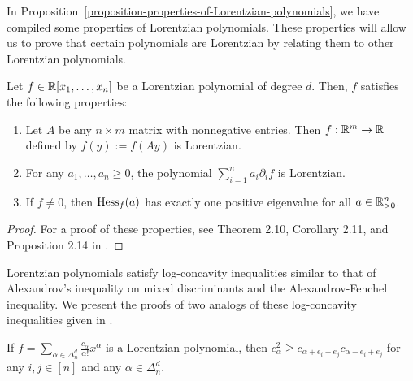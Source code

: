 \documentclass{puthesis-UG}
\begin{document}
In Proposition~\ref{proposition-properties-of-Lorentzian-polynomials}, we have compiled some properties of Lorentzian polynomials. These properties will allow us to prove that certain polynomials are Lorentzian by relating them to other Lorentzian polynomials. 

\begin{prop} \label{proposition-properties-of-Lorentzian-polynomials}
	Let $f \in \mathbb{R}[x_1, \ldots, x_n]$ be a Lorentzian polynomial of degree $d$. Then, $f$ satisfies the following properties: 
	\begin{enumerate}[label = (\alph*)]
		\item Let $A$ be any $n \times m$ matrix with nonnegative entries. Then $f : \mathbb{R}^m \to \mathbb{R}$ defined by $f(y) := f(Ay)$ is Lorentzian. 

		\item For any $a_1, \ldots, a_n \geq 0$, the polynomial $\sum_{i = 1}^n a_i \partial_i f$ is Lorentzian. 

		\item If $f \neq 0$, then $\operatorname{Hess}_f(a)$ has exactly one positive eigenvalue for all $a \in \mathbb{R}_{> 0}^n$. 
	\end{enumerate}
\end{prop}
\begin{proof}
	For a proof of these properties, see Theorem 2.10, Corollary 2.11, and Proposition 2.14 in \cite{lorentzian-polynomials}. 
\end{proof}

Lorentzian polynomials satisfy log-concavity inequalities similar to that of Alexandrov's inequality on mixed discriminants and the Alexandrov-Fenchel inequality. We present the proofs of two analogs of these log-concavity inequalities given in \cite{lorentzian-polynomials}. 

\begin{prop} \label{proposition-log-concavity-property-of-lorentzian-polynomial}
	If $f = \sum_{\alpha \in \Delta_n^d} \frac{c_\alpha}{\alpha!} x^\alpha$ is a Lorentzian polynomial, then $c_\alpha^2 \geq c_{\alpha + e_i - e_j} c_{\alpha - e_i + e_j}$ for any $i, j \in [n]$ and any $\alpha \in \Delta_n^d$. 
\end{prop}
\end{document}
